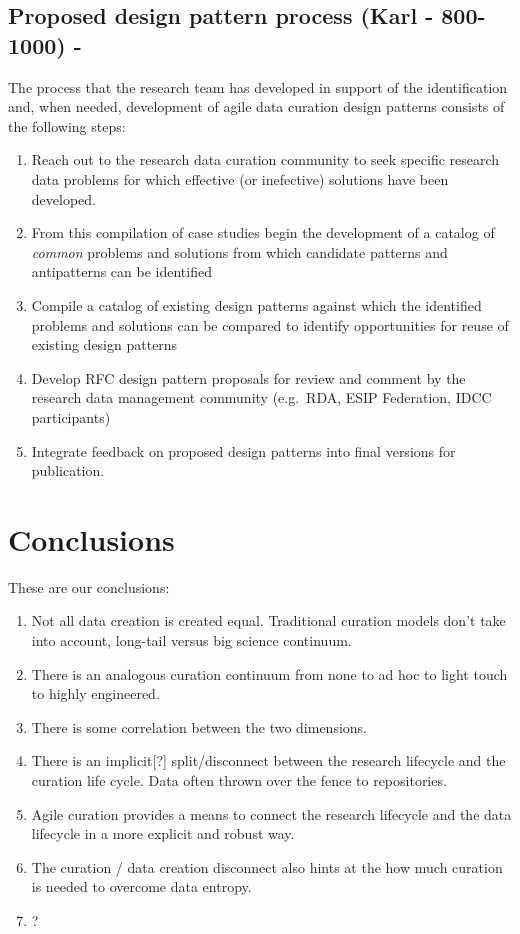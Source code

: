 \documentclass[paper]{ijdc-v9}
\providecommand{\tightlist}{%
  \setlength{\itemsep}{0pt}\setlength{\parskip}{0pt}}
\begin{document}
\subsection{Proposed design pattern process (Karl - 800-1000)
-}\label{proposed-design-pattern-process-karl---800-1000--}

The process that the research team has developed in support of the
identification and, when needed, development of agile data curation
design patterns consists of the following steps:

\begin{enumerate}
\def\labelenumi{\arabic{enumi}.}
\tightlist
\item
  Reach out to the research data curation community to seek specific
  research data problems for which effective (or inefective) solutions
  have been developed.
\item
  From this compilation of case studies begin the development of a
  catalog of \emph{common} problems and solutions from which candidate
  patterns and antipatterns can be identified
\item
  Compile a catalog of existing design patterns against which the
  identified problems and solutions can be compared to identify
  opportunities for reuse of existing design patterns
\item
  Develop RFC design pattern proposals for review and comment by the
  research data management community (e.g.~RDA, ESIP Federation, IDCC
  participants)
\item
  Integrate feedback on proposed design patterns into final versions for
  publication.
\end{enumerate}

\section{Conclusions}\label{conclusions}

These are our conclusions:

\begin{enumerate}
\def\labelenumi{\arabic{enumi}.}
\tightlist
\item
  Not all data creation is created equal. Traditional curation models
  don't take into account, long-tail versus big science continuum.
\item
  There is an analogous curation continuum from none to ad hoc to light
  touch to highly engineered.
\item
  There is some correlation between the two dimensions. 
\item
  There is an implicit{[}?{]} split/disconnect between the research
  lifecycle and the curation life cycle. Data often thrown over the
  fence to repositories.
\item
  Agile curation provides a means to connect the research lifecycle and
  the data lifecycle in a more explicit and robust way.
\item
  The curation / data creation disconnect also hints at the how much
  curation is needed to overcome data entropy.
\item
  ?
\end{enumerate}
\end{document}
